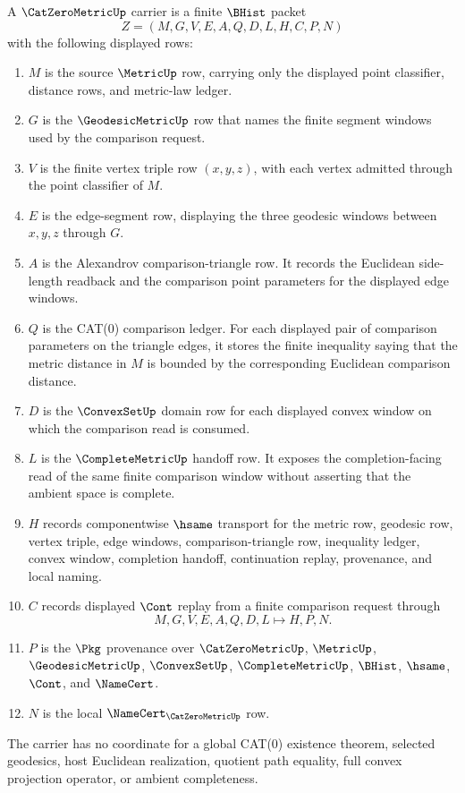 \begin{definition}
\label{def:cat-zero-metric-carrier}
A $\CatZeroMetricUp$ carrier is a finite $\BHist$ packet
$$
Z=(M,G,V,E,A,Q,D,L,H,C,P,N)
$$
with the following displayed rows:
\begin{enumerate}
\item $M$ is the source $\MetricUp$ row, carrying only the displayed point classifier, distance rows, and metric-law ledger.
\item $G$ is the $\GeodesicMetricUp$ row that names the finite segment windows used by the comparison request.
\item $V$ is the finite vertex triple row $(x,y,z)$, with each vertex admitted through the point classifier of $M$.
\item $E$ is the edge-segment row, displaying the three geodesic windows between $x,y,z$ through $G$.
\item $A$ is the Alexandrov comparison-triangle row. It records the Euclidean side-length readback and the comparison point parameters for the displayed edge windows.
\item $Q$ is the CAT(0) comparison ledger. For each displayed pair of comparison parameters on the triangle edges, it stores the finite inequality saying that the metric distance in $M$ is bounded by the corresponding Euclidean comparison distance.
\item $D$ is the $\ConvexSetUp$ domain row for each displayed convex window on which the comparison read is consumed.
\item $L$ is the $\CompleteMetricUp$ handoff row. It exposes the completion-facing read of the same finite comparison window without asserting that the ambient space is complete.
\item $H$ records componentwise $\hsame$ transport for the metric row, geodesic row, vertex triple, edge windows, comparison-triangle row, inequality ledger, convex window, completion handoff, continuation replay, provenance, and local naming.
\item $C$ records displayed $\Cont$ replay from a finite comparison request through
$$
M,G,V,E,A,Q,D,L \longmapsto H,P,N .
$$
\item $P$ is the $\Pkg$ provenance over $\CatZeroMetricUp$, $\MetricUp$, $\GeodesicMetricUp$, $\ConvexSetUp$, $\CompleteMetricUp$, $\BHist$, $\hsame$, $\Cont$, and $\NameCert$.
\item $N$ is the local $\NameCert_{\CatZeroMetricUp}$ row.
\end{enumerate}
The carrier has no coordinate for a global CAT(0) existence theorem, selected geodesics, host Euclidean realization, quotient path equality, full convex projection operator, or ambient completeness.
\end{definition}

